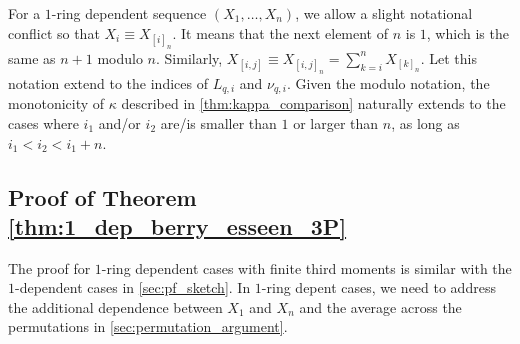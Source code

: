 \documentclass[aos]{imsart}
\begin{document}
\begin{appendix}
For a $1$-ring dependent sequence $(X_1, \dots, X_n)$, we allow a slight notational conflict so that $X_{i} \equiv X_{[i]_n}$. It means that the next element of $n$ is $1$, which is the same as $n+1$ modulo $n$. Similarly, $X_{[i,j]} \equiv X_{[i,j]_n} = \sum_{k=i}^n X_{[k]_n}$. Let this notation extend to the indices of $L_{q,i}$ and $\nu_{q,i}$.
Given the modulo notation, the monotonicity of $\kappa$ described in \cref{thm:kappa_comparison} naturally extends to the cases where $i_1$ and/or $i_2$ are/is smaller than $1$ or larger than $n$, as long as $i_1 < i_2 < i_1+n$.








\subsection{Proof of Theorem \ref{thm:1_dep_berry_esseen_3P}} \label{sec:pf_1_dep_3P}

The proof for $1$-ring dependent cases with finite third moments is similar with the $1$-dependent cases in \cref{sec:pf_sketch}. In $1$-ring depent cases, we need to address the additional dependence between $X_1$ and $X_n$ and the average across the permutations in \cref{sec:permutation_argument}. 


\end{appendix}
\end{document}
